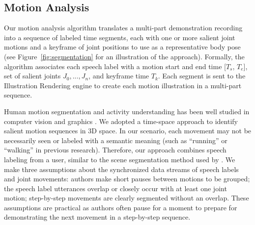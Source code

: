 
%


\subsection {Motion Analysis}

Our motion analysis algorithm translates a multi-part demonstration recording into a sequence of labeled time segments, each with one or more salient joint motions and a keyframe of joint positions to use as a representative body pose (see Figure~\ref{fig:segmentation} for an illustration of the approach).
Formally, the algorithm associates each speech label with a motion start and end time [$T_s$, $T_e$], set of salient joints ${J_0, ..., J_n}$, and keyframe time $T_k$.
Each segment is sent to the Illustration Rendering engine to create each motion illustration in a multi-part sequence.

Human motion segmentation and activity understanding has been well studied in computer vision and graphics \cite{Aggarwal:2011:HAA:1922649.1922653}. We adopted a time-space approach to identify salient motion sequences in 3D space.
%
In our scenario, each movement may not be necessarily seen or labeled with a semantic meaning (such as ``running'' or ``walking'' in previous research). Therefore, our approach combines speech labeling from a user, similar to the scene segmentation method used by \cite{chi2013democut}.
%
We make three assumptions about the synchronized data streams of speech labels and joint movements:
authors make short pauses between motions to be grouped;
the speech label utterances overlap or closely occur with at least one joint motion;
step-by-step movements are clearly segmented without an overlap.
%
These assumptions are practical as authors often pause for a moment to prepare for demonstrating the next movement in a step-by-step sequence.

